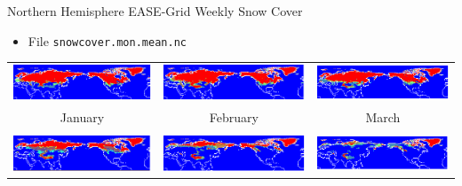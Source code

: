 \documentclass[compress,11pt,xcolor=svgnames,aspectratio=169]{beamer}
\begin{document}
\begin{frame}[fragile]{Northern Hemisphere EASE-Grid Weekly Snow Cover}

\begin{itemize}

  \item File \verb|snowcover.mon.mean.nc|

\end{itemize}

\begin{center}
{\tiny
\begin{tabular}{ccc}
\includegraphics[scale=0.35]{fig/snow12} &
\includegraphics[scale=0.35]{fig/snow11} &
\includegraphics[scale=0.35]{fig/snow10} \\
January & February & March \\ & & \\
\includegraphics[scale=0.35]{fig/snow9} &
\includegraphics[scale=0.35]{fig/snow8} &
\includegraphics[scale=0.35]{fig/snow7} \\

\end{tabular}}
\end{center}
\end{frame}
\end{document}
